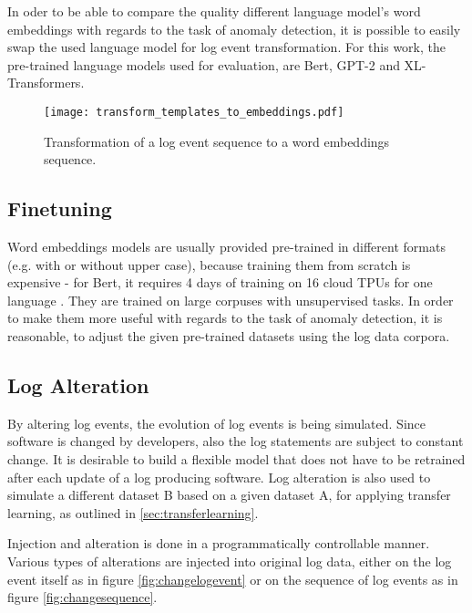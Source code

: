 In oder to be able to compare the quality different language model's word embeddings with regards to the task of anomaly detection, it is possible to easily swap the used language model for log event transformation. For this work, the pre-trained language models used for evaluation, are Bert, GPT-2 and XL-Transformers. 


\begin{figure}[H]
	\centering
	\texttt{[image: transform\_templates\_to\_embeddings.pdf]}
	\caption{Transformation of a log event sequence to a word embeddings sequence.}
	\label{fig:transform_sequence_to_embeddings}
\end{figure}



\subsection{Finetuning\label{sec:finetuning}}
Word embeddings models are usually provided pre-trained in different formats (e.g. with or without upper case), because training them from scratch is expensive - for Bert, it requires 4 days of training on 16 cloud TPUs for one language \cite{googlebert}. They are trained on large corpuses with unsupervised tasks. In order to make them more useful with regards to the task of anomaly detection, it is reasonable, to adjust the given pre-trained datasets using the log data corpora.

\subsection{Log Alteration\label{sec:logs_alteration}}
By altering log events, the evolution of log events is being simulated. Since software is changed by developers, also the log statements are subject to constant change. It is desirable to build a flexible model that does not have to be retrained after each update of a log producing software. Log alteration is also used to simulate a different dataset B based on a given dataset A, for applying transfer learning, as outlined in \ref{sec:transferlearning}.

Injection and alteration is done in a programmatically controllable manner. Various types of alterations are injected into original log data, either on the log event itself as in figure \ref{fig:changelogevent} or on the sequence of log events as in figure \ref{fig:changesequence}.

